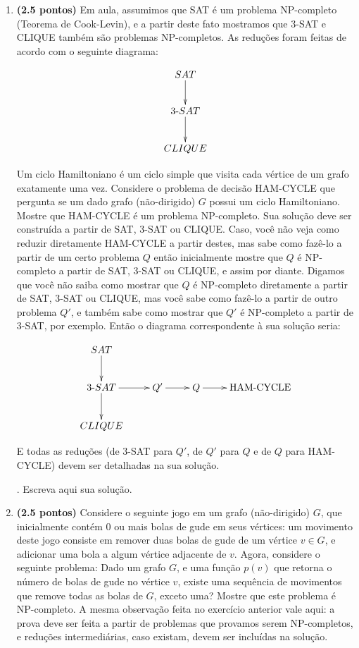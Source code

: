 \documentclass[12pt]{article}
\newcommand{\resposta}[1]{ \noindent {\bf Solução}.{\color{blue} #1}}
\begin{document}
\begin{enumerate}
{ }
 
\item {\bf (2.5 pontos)} Em aula, assumimos que SAT é um problema
  NP-completo (Teorema de Cook-Levin), e a partir deste fato mostramos
  que 3-SAT e CLIQUE também são problemas NP-completos. As reduções
  foram feitas de acordo com o seguinte diagrama:

  $$\xymatrix{
    SAT \ar[d] \\
    3\mbox{-}SAT \ar[d] \\
    CLIQUE 
  }$$
  
  Um ciclo Hamiltoniano é um ciclo simple que visita cada vértice de
  um grafo exatamente uma vez. Considere o problema de decisão
  HAM-CYCLE que pergunta se um dado grafo (não-dirigido) $G$ possui um
  ciclo Hamiltoniano. Mostre que HAM-CYCLE é um problema
  NP-completo. Sua solução deve ser construída a partir de SAT, 3-SAT
  ou CLIQUE. Caso, você não veja como reduzir diretamente HAM-CYCLE a
  partir destes, mas sabe como fazê-lo a partir de um certo problema
  $Q$ então inicialmente mostre que $Q$ é NP-completo a partir de SAT,
  3-SAT ou CLIQUE, e assim por diante. Digamos que você não saiba como
  mostrar que $Q$ é NP-completo diretamente a partir de SAT, 3-SAT ou
  CLIQUE, mas você sabe como fazê-lo a partir de outro problema $Q'$,
  e também sabe como mostrar que $Q'$ é NP-completo a partir de 3-SAT,
  por exemplo. Então o diagrama correspondente à sua solução seria:

$$\xymatrix{
  SAT \ar[d] & & & \\
  3\mbox{-}SAT \ar[d]\ar[r] & Q' \ar[r] & Q \ar[r] & \mbox{HAM-CYCLE}  \\
  CLIQUE & & & 
}$$

E todas as reduções (de 3-SAT para $Q'$, de $Q'$ para $Q$ e de $Q$ para HAM-CYCLE) devem ser detalhadas na sua solução.

\resposta{
    Escreva aqui sua solução.
  }
  
\item {\bf (2.5 pontos)} Considere o seguinte jogo em um grafo
  (não-dirigido) $G$, que inicialmente contém 0 ou mais bolas de gude
  em seus vértices: um movimento deste jogo consiste em remover duas
  bolas de gude de um vértice $v\in G$, e adicionar uma bola a algum
  vértice adjacente de $v$. Agora, considere o seguinte problema: Dado
  um grafo $G$, e uma função $p(v)$ que retorna o número de bolas de
  gude no vértice $v$, existe uma sequência de movimentos que remove
  todas as bolas de $G$, exceto uma? Mostre que este problema é
  NP-completo. A mesma observação feita no exercício anterior vale
  aqui: a prova deve ser feita a partir de problemas que provamos
  serem NP-completos, e reduções intermediárias, caso existam, devem
  ser incluídas na solução.


\end{enumerate}
\end{document}
